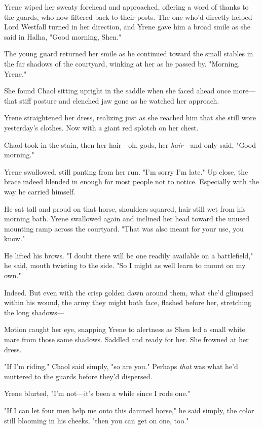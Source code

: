 Yrene wiped her sweaty forehead and approached, offering a word of thanks to the guards, who now filtered back to their posts. The one who'd directly helped Lord Westfall turned in her direction, and Yrene gave him a broad smile as she said in Halha, "Good morning, Shen."

The young guard returned her smile as he continued toward the small stables in the far shadows of the courtyard, winking at her as he passed by. "Morning, Yrene."

She found Chaol sitting upright in the saddle when she faced ahead once more---that stiff posture and clenched jaw gone as he watched her approach.

Yrene straightened her dress, realizing just as she reached him that she still wore yesterday's clothes. Now with a giant red splotch on her chest.

Chaol took in the stain, then her hair---oh, gods, her \emph{hair}---and only said, "Good morning."

Yrene swallowed, still panting from her run. "I'm sorry I'm late." Up close, the brace indeed blended in enough for most people not to notice. Especially with the way he carried himself.

He sat tall and proud on that horse, shoulders squared, hair still wet from his morning bath. Yrene swallowed again and inclined her head toward the unused mounting ramp across the courtyard. "That was also meant for your use, you know."

He lifted his brows. "I doubt there will be one readily available on a battlefield," he said, mouth twisting to the side. "So I might as well learn to mount on my own."

Indeed. But even with the crisp golden dawn around them, what she'd glimpsed within his wound, the army they might both face, flashed before her, stretching the long shadows---

Motion caught her eye, snapping Yrene to alertness as Shen led a small white mare from those same shadows. Saddled and ready for her. She frowned at her dress.

"If I'm riding," Chaol said simply, "so are you." Perhaps
\emph{that} was what he'd muttered to the guards before they'd dispersed.

Yrene blurted, "I'm not---it's been a while since I rode one."

"If I can let four men help me onto this damned horse," he said simply, the color still blooming in his cheeks, "then you can get on one, too."


